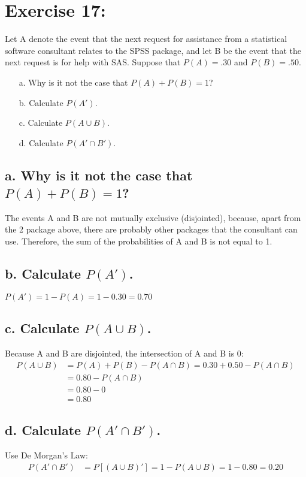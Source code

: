 \newpage
\section{Exercise 17:}

\begin{displayquote}
    Let A denote the event that the next request for assistance from a statistical software consultant relates to the SPSS package, and let B be the event that the next request is for help with SAS\@. Suppose that \(P(A) = .30\)  and \(P(B) = .50\).
    \begin{itemize}
        \item [a.] Why is it not the case that \(P(A) + P(B) = 1\)?
        \item [b.] Calculate \(P(A')\).
        \item [c.] Calculate \(P(A \cup B)\).
        \item [d.] Calculate \(P(A' \cap B')\).
    \end{itemize}
\end{displayquote}

\subsection{a. Why is it not the case that \(P(A) + P(B) = 1\)?}
The events A and B are not mutually exclusive (disjointed), because, apart from the 2 package above, there are probably other packages that the consultant can use. Therefore, the sum of the probabilities of A and B is not equal to 1.

\subsection{b. Calculate \(P(A')\).}
\(P(A') = 1 - P(A) = 1 - 0.30 = 0.70\)

\subsection{c. Calculate \(P(A \cup B)\).}
Because A and B are disjointed, the intersection of A and B is 0:
\begin{equation}
    \begin{split}
        P(A \cup B) & = P(A) + P(B) - P(A \cap B) = 0.30 + 0.50 - P(A \cap B) \\
                    & = 0.80 - P(A \cap B)                                    \\
                    & = 0.80 - 0                                              \\
                    & = 0.80
    \end{split}
\end{equation}

\subsection{d. Calculate \(P(A' \cap B')\).}
Use De Morgan's Law:
\begin{equation}
    \begin{split}
        P(A' \cap B') & = P[(A \cup B)'] = 1 - P(A \cup B) = 1 - 0.80 = 0.20
    \end{split}
\end{equation}
